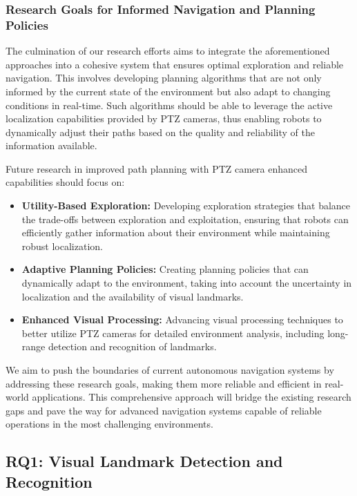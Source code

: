 \documentclass[runningheads]{llncs}
\begin{document}
\subsubsection{Research Goals for Informed Navigation and Planning Policies}

The culmination of our research efforts aims to integrate the aforementioned approaches into a cohesive system that ensures optimal exploration and reliable navigation. This involves developing planning algorithms that are not only informed by the current state of the environment but also adapt to changing conditions in real-time. Such algorithms should be able to leverage the active localization capabilities provided by PTZ cameras, thus enabling robots to dynamically adjust their paths based on the quality and reliability of the information available.

Future research in improved path planning with PTZ camera enhanced capabilities should focus on:

\begin{itemize}
    \item \textbf{Utility-Based Exploration:}
    Developing exploration strategies that balance the trade-offs between exploration and exploitation, ensuring that robots can efficiently gather information about their environment while maintaining robust localization.

    \item \textbf{Adaptive Planning Policies:}
    Creating planning policies that can dynamically adapt to the environment, taking into account the uncertainty in localization and the availability of visual landmarks.

    \item \textbf{Enhanced Visual Processing:}
    Advancing visual processing techniques to better utilize PTZ cameras for detailed environment analysis, including long-range detection and recognition of landmarks.

\end{itemize}

We aim to push the boundaries of current autonomous navigation systems by addressing these research goals, making them more reliable and efficient in real-world applications. This comprehensive approach will bridge the existing research gaps and pave the way for advanced navigation systems capable of reliable operations in the most challenging environments.

\subsection{RQ1: Visual Landmark Detection and Recognition}
\end{document}
